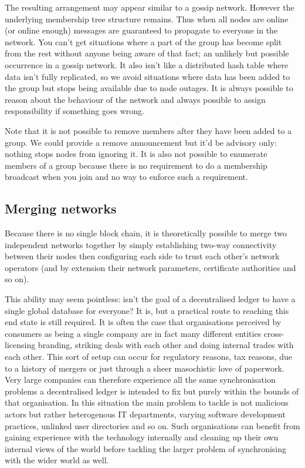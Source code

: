\documentclass{article}
\begin{document}
The resulting arrangement may appear similar to a gossip network. However the underlying membership tree structure
remains. Thus when all nodes are online (or online enough) messages are guaranteed to propagate to everyone in the
network. You can't get situations where a part of the group has become split from the rest without anyone being
aware of that fact; an unlikely but possible occurrence in a gossip network. It also isn't like a distributed hash
table where data isn't fully replicated, so we avoid situations where data has been added to the group but stops
being available due to node outages. It is always possible to reason about the behaviour of the network and always
possible to assign responsibility if something goes wrong.

Note that it is not possible to remove members after they have been added to a group. We could provide a remove
announcement but it'd be advisory only: nothing stops nodes from ignoring it. It is also not possible to enumerate
members of a group because there is no requirement to do a membership broadcast when you join and no way to enforce
such a requirement.


\subsection{Merging networks}

Because there is no single block chain, it is theoretically possible to merge two independent networks together by simply
establishing two-way connectivity between their nodes then configuring each side to trust each other's network operators
(and by extension their network parameters, certificate authorities and so on).

This ability may seem pointless: isn't the goal of a decentralised ledger to have a single global database for
everyone? It is, but a practical route to reaching this end state is still required. It is often the case that
organisations perceived by consumers as being a single company are in fact many different entities cross-licensing
branding, striking deals with each other and doing internal trades with each other. This sort of setup can occur
for regulatory reasons, tax reasons, due to a history of mergers or just through a sheer masochistic love of
paperwork. Very large companies can therefore experience all the same synchronisation problems a decentralised
ledger is intended to fix but purely within the bounds of that organisation. In this situation the main problem to
tackle is not malicious actors but rather heterogenous IT departments, varying software development practices,
unlinked user directories and so on. Such organisations can benefit from gaining experience with the technology
internally and cleaning up their own internal views of the world before tackling the larger problem of
synchronising with the wider world as well.
\end{document}
